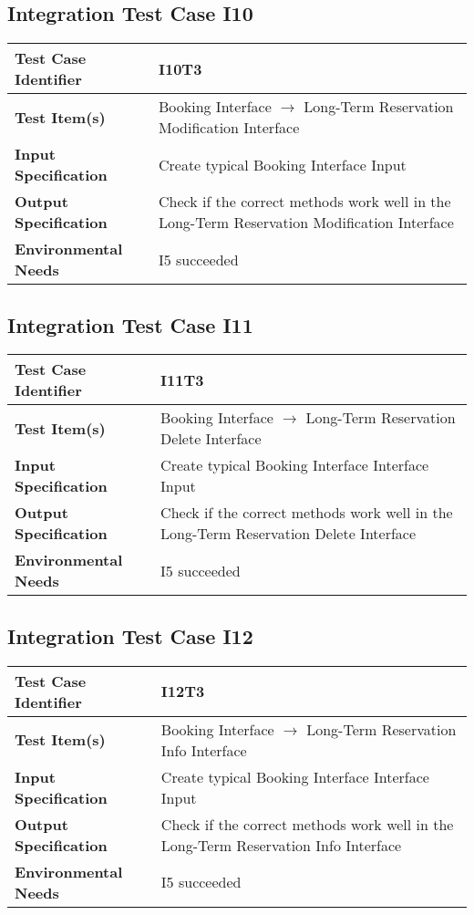 \subsection{Integration Test Case I10}
\begin{tabular}{l p{9cm}}
	\hline
	\textbf{Test	Case Identifier} & I10T3 \\ \hline
	\textbf{Test	Item(s)} & Booking Interface $\rightarrow$ Long-Term Reservation Modification Interface \\ \hline
	\textbf{Input Specification} & Create typical Booking Interface Input\\ \hline
	\textbf{Output Specification} & Check if the correct methods work well in the Long-Term Reservation Modification Interface \\ \hline
	\textbf{Environmental Needs} & I5 succeeded \\ \hline
\end{tabular}
\subsection{Integration Test Case I11}
\begin{tabular}{l p{9cm}}
	\hline
	\textbf{Test	Case Identifier} & I11T3 \\ \hline
	\textbf{Test	Item(s)} & Booking Interface $\rightarrow$ Long-Term Reservation Delete Interface \\ \hline
	\textbf{Input Specification} & Create typical Booking Interface Interface Input\\ \hline
	\textbf{Output Specification} & Check if the correct methods work well in the Long-Term Reservation Delete Interface \\ \hline
	\textbf{Environmental Needs} & I5 succeeded \\ \hline
\end{tabular}
\subsection{Integration Test Case I12}
\begin{tabular}{l p{9cm}}
	\hline
	\textbf{Test	Case Identifier} & I12T3 \\ \hline
	\textbf{Test	Item(s)} & Booking Interface $\rightarrow$ Long-Term Reservation Info Interface \\ \hline
	\textbf{Input Specification} & Create typical Booking Interface Interface Input\\ \hline
	\textbf{Output Specification} & Check if the correct methods work well in the Long-Term Reservation Info Interface \\ \hline
	\textbf{Environmental Needs} & I5 succeeded \\ \hline
\end{tabular}
